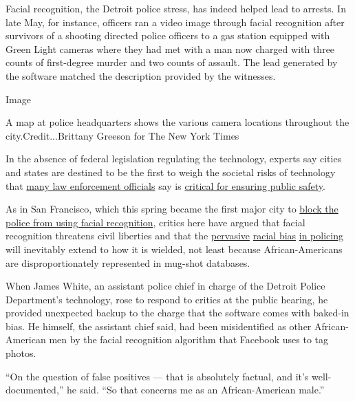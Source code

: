 Facial recognition, the Detroit police stress, has indeed helped lead to
arrests. In late May, for instance, officers ran a video image through
facial recognition after survivors of a shooting directed police
officers to a gas station equipped with Green Light cameras where they
had met with a man now charged with three counts of first-degree murder
and two counts of assault. The lead generated by the software matched
the description provided by the witnesses.

Image

A map at police headquarters shows the various camera locations
throughout the city.Credit...Brittany Greeson for The New York Times

In the absence of federal legislation regulating the technology, experts
say cities and states are destined to be the first to weigh the societal
risks of technology that
\href{https://www.nytimes3xbfgragh.onion/2019/05/18/us/facial-recognition-police.html}{many
law enforcement officials} say is
\href{https://www.nytimes3xbfgragh.onion/2019/06/09/opinion/facial-recognition-police-new-york-city.html}{critical
for ensuring public safety}.

As in San Francisco, which this spring became the first major city to
\href{https://www.nytimes3xbfgragh.onion/2019/07/01/us/facial-recognition-san-francisco.html}{block
the police from using facial recognition}, critics here have argued that
facial recognition threatens civil liberties and that the
\href{https://www.bjs.gov/content/pub/pdf/cpp15.pdf}{pervasive}
\href{https://www.detroitnews.com/story/news/local/detroit-city/2019/04/24/detroit-police-chief-cites-racially-tone-deaf-culture-6th-precinct/3554141002/}{racial
bias}
\href{https://www.washingtonpost.com/news/opinions/wp/2018/09/18/theres-overwhelming-evidence-that-the-criminal-justice-system-is-racist-heres-the-proof/?utm_term=.01ee3c3c5895}{in
policing} will inevitably extend to how it is wielded, not least because
African-Americans are disproportionately represented in mug-shot
databases.

When James White, an assistant police chief in charge of the Detroit
Police Department's technology, rose to respond to critics at the public
hearing, he provided unexpected backup to the charge that the software
comes with baked-in bias. He himself, the assistant chief said, had been
misidentified as other African-American men by the facial recognition
algorithm that Facebook uses to tag photos.

``On the question of false positives --- that is absolutely factual, and
it's well-documented,'' he said. ``So that concerns me as an
African-American male.''

